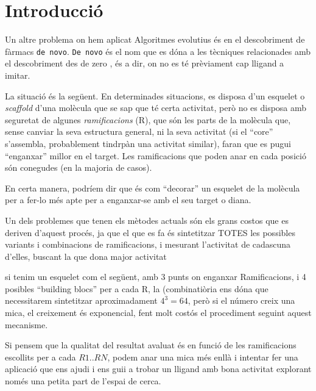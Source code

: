 %

\section{Introducció} %
	\label{sec:Introduccio}
	Un altre problema on hem aplicat Algoritmes evolutius és en el descobriment
	de fàrmacs \texttt{de novo}.  \texttt{De novo} és el nom que es dóna a les
	tècniques relacionades amb el descobriment des de zero , és a dir, on no es té
	prèviament cap lligand a imitar.

	La situació és la següent.  En determinades situacions, es disposa d'un
	esquelet o \textit{scaffold} d'una molècula que se sap que té certa
	activitat, però no es disposa amb seguretat de algunes
	\textit{ramificacions} (R), que són les parts de la molècula que, sense
	canviar la seva estructura general, ni la seva activitat (si el ``core''
	s'assembla, probablement tindrpàn una activitat similar), faran que es pugui
	``enganxar'' millor en el target.  Les ramificacions que poden anar en cada
	posició són conegudes (en la majoria de casos).

	En certa manera, podríem dir que és com ``decorar'' un esquelet de la
	molècula per a fer-lo més apte per a enganxar-se amb el seu target o diana.

	Un dels problemes que tenen els mètodes actuals són els grans costos
	que es deriven d'aquest procés, ja que el que es fa és sintetitzar TOTES les
	possibles variants i combinacions de ramificacions, i mesurant l'activitat
	de cadascuna d'elles, buscant la que dona major activitat

	si tenim un esquelet com el següent, amb 3 punts on enganxar Ramificacions,
	i 4 posibles ``building blocs'' per a cada R, la (combinatiòria ens dóna que
	necessitarem sintetitzar aproximadament $4^3 = 64 $, però si el número creix
	una mica, el creixement és exponencial, fent molt costós el procediment
	seguint aquest mecanisme.

	Si pensem que la qualitat del resultat avaluat és en funció de les
	ramificacions escollits per a cada $R1..RN$, podem anar una mica més enllà i
	intentar fer una aplicació que ens ajudi i ens guii a trobar un lligand amb
	bona activitat explorant només una petita part de l'espai de cerca.
	
